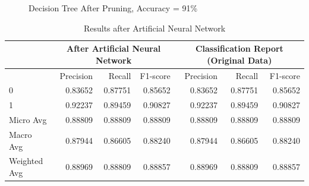 \documentclass{article}
\begin{document}
\begin{figure}[H]
	\caption{\label{fig:my-label}Decision Tree After Pruning, Accuracy = 91\%}
\end{figure}


\begin{table}[H]
\caption{Results after Artificial Neural Network}
  \label{ANN Results}
  \centering
\begin{tabular}{lrrrrrr} %
\toprule
  & \multicolumn{3}{c}{After Artificial Neural Network} & \multicolumn{3}{c}{Classification Report (Original Data)} \\ 
  \midrule 
  & Precision & Recall & F1-score & Precision & Recall & F1-score \\ 
\midrule
		0            & 0.83652   & 0.87751 & 0.85652  & 0.83652   & 0.87751 & 0.85652 \\
		1            & 0.92237   & 0.89459 & 0.90827  & 0.92237   & 0.89459 & 0.90827  \\
		Micro Avg    & 0.88809   & 0.88809 & 0.88809   & 0.88809   & 0.88809 & 0.88809 \\
		Macro Avg    & 0.87944   & 0.86605 & 0.88240  & 0.87944   & 0.86605 & 0.88240\\
		Weighted Avg & 0.88969   & 0.88809 & 0.88857  & 0.88969   & 0.88809 & 0.88857 \\
	\end{tabular}
\end{table}
\end{document}
